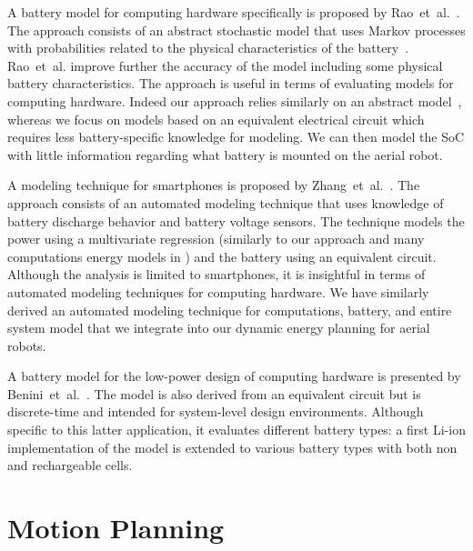 A battery model for computing hardware specifically is proposed by Rao~et~al.~\citep{rao2005battery}. The approach consists of an abstract stochastic model that uses Markov processes with probabilities related to the physical characteristics of the battery~\citep{panigrahi2001battery}. Rao~et~al. improve further the accuracy of the model including some physical battery characteristics. The approach is useful in terms of evaluating models for computing hardware. Indeed our approach relies similarly on an abstract model~\citep{hasan2018exogenous}, whereas we focus on models based on an equivalent electrical circuit which requires less battery-specific knowledge for modeling. We can then model the SoC with little information regarding what battery is mounted on the aerial robot. 

A modeling technique for smartphones is proposed by Zhang~et~al.~\citep{zhang2010accurate}. The approach consists of an automated modeling technique that uses knowledge of battery discharge behavior and battery voltage sensors. The technique models the power using a multivariate regression (similarly to our approach and many computations energy models in ) and the battery using an equivalent circuit. Although the analysis is limited to smartphones, it is insightful in terms of automated modeling techniques for computing hardware. We have similarly derived an automated modeling technique for computations, battery, and entire system model that we integrate into our dynamic energy planning for aerial robots.

A battery model for the low-power design of computing hardware is presented by Benini~et~al.~\citep{benini2001discrete}. The model is also derived from an equivalent circuit but is discrete-time and intended for system-level design environments. Although specific to this latter application, it evaluates different battery types: a first Li-ion implementation of the model is extended to various battery types with both non and rechargeable cells. 


\section{Motion Planning}
\label{sec:soa-motion-pl}

